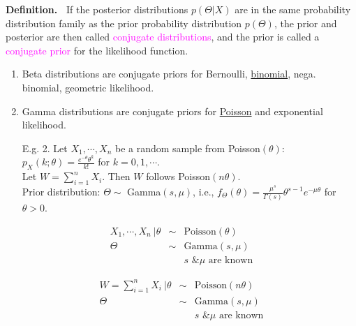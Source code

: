  \begin{frame}

 {\bf Definition.~} If the posterior distributions $p(\Theta| X)$ are in the same probability distribution family as the prior probability distribution $p(\Theta)$,
 the prior and posterior are then called \textcolor{magenta}{conjugate distributions}, and the prior is called a \textcolor{magenta}{conjugate prior} for the likelihood function.

 \vfill
 \begin{enumerate}
  \item Beta distributions are conjugate priors for Bernoulli, \underline{binomial}, nega. binomial, geometric  likelihood.
  \\[1em]
  \item Gamma distributions are conjugate priors for \underline{Poisson} and exponential likelihood.
 \end{enumerate}

\end{frame}
\begin{frame}

\begin{enumerate}
 \item[E.g. 2.] Let $X_1,\cdots, X_n$ be a random sample from Poisson$(\theta)$: $p_X(k;\theta) = \frac{e^{-\theta}\theta^k}{k!}$ for $k=0,1,\cdots$.\\[1em]  \pause
 Let $W=\sum_{i=1}^n X_i$. \pause
 Then $W$ follows Poisson$(n\theta)$. \\[1em] \pause
 Prior distribution: $\Theta\sim$ Gamma$(s,\mu)$, i.e., $f_\Theta(\theta)=\frac{\mu^s}{\Gamma(s)}\theta^{s-1}e^{-\mu\theta}$ for $\theta>0$. \\[1em]\pause
\end{enumerate}
\vfill
\begin{minipage}{0.45\textwidth}
\begin{eqnarray*}
 X_1,\cdots, X_n \:\big| \theta &\sim &\text{Poisson$(\theta)$}\\
 \Theta & \sim& \text{Gamma$(s,\mu)$}\\
 && \text{$s$ \& $\mu$ are known}
\end{eqnarray*}
\end{minipage}
\hfill
\begin{minipage}{0.45\textwidth}
\begin{eqnarray*}
 W=\sum_{i=1}^nX_i \: \bigg| \theta&\sim& \text{Poisson$(n\theta)$}\\
 \Theta & \sim& \text{Gamma$(s,\mu)$}\\
 && \text{$s$ \& $\mu$ are known}
\end{eqnarray*}
\end{minipage}
\end{frame}
